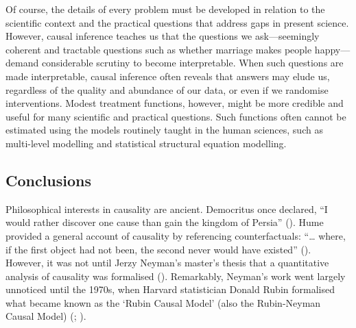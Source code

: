 \documentclass[
  single column]{article}
\begin{document}
Of course, the details of every problem must be developed in relation to
the scientific context and the practical questions that address gaps in
present science. However, causal inference teaches us that the questions
we ask---seemingly coherent and tractable questions such as whether
marriage makes people happy---demand considerable scrutiny to become
interpretable. When such questions are made interpretable, causal
inference often reveals that answers may elude us, regardless of the
quality and abundance of our data, or even if we randomise
interventions. Modest treatment functions, however, might be more
credible and useful for many scientific and practical questions. Such
functions often cannot be estimated using the models routinely taught in
the human sciences, such as multi-level modelling and statistical
structural equation modelling.

\subsection{Conclusions}\label{id-sec-5}

Philosophical interests in causality are ancient. Democritus once
declared, ``I would rather discover one cause than gain the kingdom of
Persia'' (). Hume
provided a general account of causality by referencing counterfactuals:
``\ldots{} where, if the first object had not been, the second never
would have existed'' (). However, it
was not until Jerzy Neyman's master's thesis that a quantitative
analysis of causality was formalised
(). Remarkably, Neyman's
work went largely unnoticed until the 1970s, when Harvard statistician
Donald Rubin formalised what became known as the `Rubin Causal Model'
(also the Rubin-Neyman Causal Model)
(;
).
\end{document}
